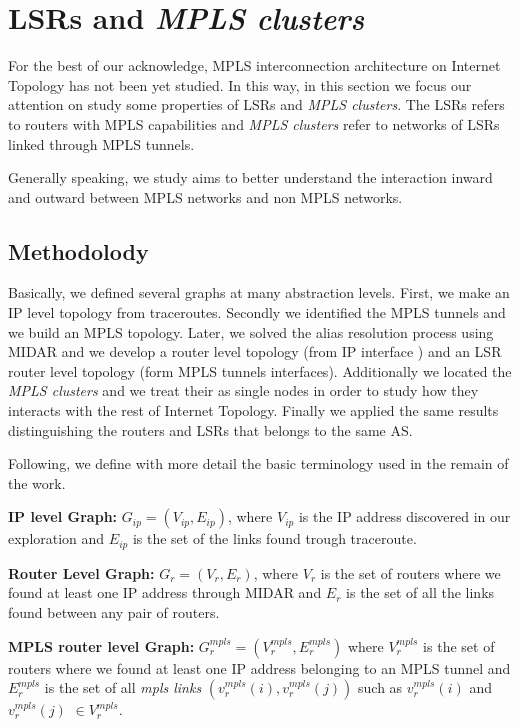 \section{LSRs and \textit{MPLS clusters}}\label{cluster}
For the best of our acknowledge, MPLS interconnection architecture on Internet Topology has not
been yet studied. In this way, in this section we focus our attention on study some properties
of LSRs and \textit{MPLS clusters}. The LSRs refers to routers
with MPLS capabilities and \textit{MPLS clusters} refer to networks of
LSRs linked through MPLS tunnels.

Generally speaking, we study aims to better understand the
interaction inward and outward between MPLS networks and non MPLS networks.

\subsection{Methodolody}\label{cluster.methodo}

Basically, we defined several graphs at many abstraction levels. First, we make an IP level topology from traceroutes. Secondly we identified the MPLS tunnels and we
build an MPLS topology. Later, we solved the alias resolution process using MIDAR and we develop a router level topology (from IP interface ) and an LSR router level topology (form MPLS tunnels interfaces). Additionally  we located the \textit{MPLS clusters} and we treat their as single nodes in order to study how they interacts with the rest of Internet Topology. Finally we applied the same results distinguishing the routers and LSRs that belongs to the same AS.

Following,  we define with more detail the basic terminology used in the
remain of the work. 

\textbf{IP level Graph:} $G_{ip}=(V_{ip}, E_{ip})$, where
$V_{ip}$ is the IP address discovered in our exploration and $E_{ip}$ is the set
of the links found trough traceroute.

\textbf{Router Level Graph:} $G_{r}=(V_{r}, E_{r})$, where $V_{r}$ is the set of routers where we found
at least one IP address through MIDAR and $E_{r}$ is the set of all the links found between
any pair of routers.

\textbf{MPLS router level Graph:} $G^{mpls}_{r}=(V^{mpls}_{r},
E^{mpls}_{r})$ where  $V^{mpls}_{r}$ is the set of routers where we found
at least one IP address belonging to an MPLS tunnel and  $E^{mpls}_{r}$ is the
set of all \textit{mpls links} $(v^{mpls}_{r}(i), v^{mpls}_{r}(j))$ such as
$v^{mpls}_{r}(i)$ and  $v^{mpls}_{r}(j)$  $\in V^{mpls}_{r}$.

